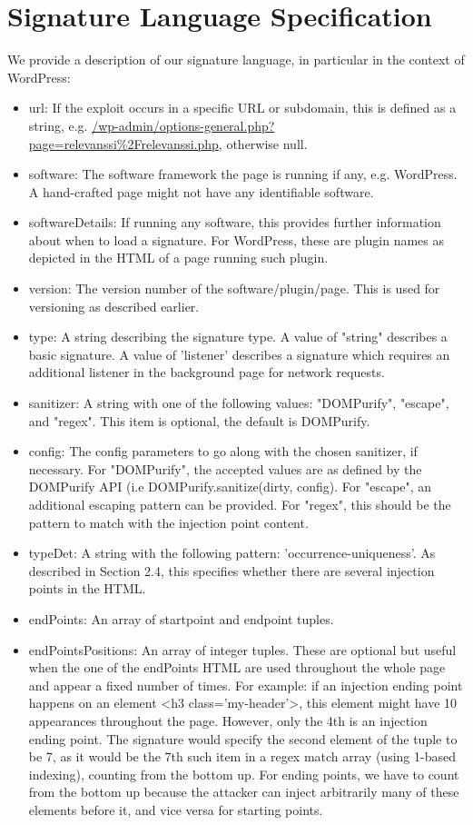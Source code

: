\appendix
\section{Signature Language Specification} \label{appendix:language_specification}
We provide a description of our signature language, in particular in the context of WordPress:
\begin{itemize}
	\item
	url: If the exploit occurs in a specific URL or subdomain, this is defined as a string, e.g.
	\url{/wp-admin/options-general.php?page=relevanssi\%2Frelevanssi.php}, otherwise null.
	\item
	software: The software framework the page is running if any, e.g. WordPress. A hand-crafted page
	might not have any identifiable software.
	\item
	softwareDetails: If running any software, this provides further information about when to load a signature. For WordPress, these are plugin names as depicted in the HTML of a page running such plugin.
	\item
	version: The version number of the software/plugin/page. This is used for versioning as described earlier.
	\item 
	type: A string describing the signature type. A value of "string" describes a basic signature. A value of 'listener' describes a signature which requires an additional listener in the background page for network requests.
	\item 
	sanitizer: A string with one of the following values: "DOMPurify", "escape", and "regex". This item is optional, the default is DOMPurify.
	\item
	config: The config parameters to go along with the chosen sanitizer, if necessary. For "DOMPurify", the accepted values are as defined by the DOMPurify API (i.e DOMPurify.sanitize(dirty, config). For "escape", an additional escaping pattern can be provided. For "regex", this should be the pattern to match with the injection point content.
	\item
	typeDet: A string with the following pattern: 'occurrence-uniqueness'. As described in Section 2.4, this specifies whether there are several injection points in the HTML.
	\item
	endPoints: An array of startpoint and endpoint tuples.
	\item 
	endPointsPositions: An array of integer tuples. These are optional but useful when the one of the endPoints HTML are used throughout the whole page and appear a fixed number of times. For example: if an injection ending point happens on an element <h3 class='my-header'>, this element might have 10 appearances throughout the page. However, only the 4th is an injection ending point. The signature would specify the second element of the tuple to be 7, as it would be the 7th such item in a regex match array (using 1-based indexing), counting from the bottom up. For ending points, we have to count from the bottom up because the attacker can inject arbitrarily many of these elements before it, and vice versa for starting points.
\end{itemize}


